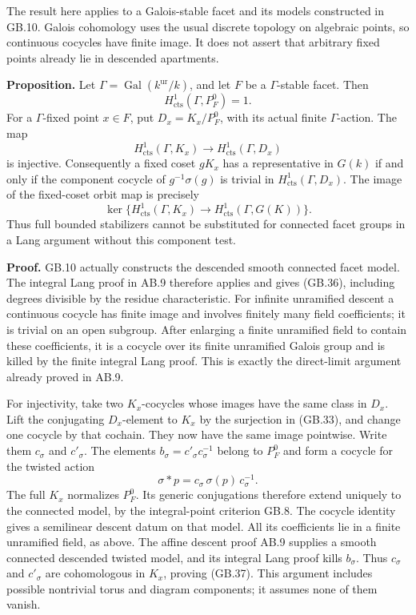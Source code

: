 \documentclass[
  11pt,
]{article}
\begin{document}
The result here applies to a Galois-stable facet and its models
constructed in GB.10. Galois cohomology uses the usual discrete topology
on algebraic points, so continuous cocycles have finite image. It does
not assert that arbitrary fixed points already lie in descended
apartments.

\textbf{Proposition.} Let
\(\Gamma=\operatorname {Gal}(k^{\mathrm{ur}}/k)\), and let \(F\) be a
\(\Gamma\)-stable facet. Then \[
 H^1_{\mathrm{cts}}(\Gamma,P_F^0)=1.
 \tag{GB.36}
\] For a \(\Gamma\)-fixed point \(x\in F\), put \(D_x=K_x/P_F^0\), with
its actual finite \(\Gamma\)-action. The map \[
 H^1_{\mathrm{cts}}(\Gamma,K_x)\longrightarrow
 H^1_{\mathrm{cts}}(\Gamma,D_x)
 \tag{GB.37}
\] is injective. Consequently a fixed coset \(gK_x\) has a
representative in \(G(k)\) if and only if the component cocycle of
\(g^{-1}\sigma(g)\) is trivial in \(H^1_{\mathrm{cts}}(\Gamma,D_x)\).
The image of the fixed-coset orbit map is precisely \[
 \ker\{H^1_{\mathrm{cts}}(\Gamma,K_x)
                 \longrightarrow H^1_{\mathrm{cts}}(\Gamma,G(K))\}.
 \tag{GB.38}
\] Thus full bounded stabilizers cannot be substituted for connected
facet groups in a Lang argument without this component test.

\textbf{Proof.} GB.10 actually constructs the descended smooth connected
facet model. The integral Lang proof in AB.9 therefore applies and gives
(GB.36), including degrees divisible by the residue characteristic. For
infinite unramified descent a continuous cocycle has finite image and
involves finitely many field coefficients; it is trivial on an open
subgroup. After enlarging a finite unramified field to contain these
coefficients, it is a cocycle over its finite unramified Galois group
and is killed by the finite integral Lang proof. This is exactly the
direct-limit argument already proved in AB.9.

For injectivity, take two \(K_x\)-cocycles whose images have the same
class in \(D_x\). Lift the conjugating \(D_x\)-element to \(K_x\) by the
surjection in (GB.33), and change one cocycle by that cochain. They now
have the same image pointwise. Write them \(c_\sigma\) and
\(c'_\sigma\). The elements \(b_\sigma=c'_\sigma c_\sigma^{-1}\) belong
to \(P_F^0\) and form a cocycle for the twisted action \[
 \sigma * p=c_\sigma\,\sigma(p)\,c_\sigma^{-1}.
 \tag{GB.39}
\] The full \(K_x\) normalizes \(P_F^0\). Its generic conjugations
therefore extend uniquely to the connected model, by the integral-point
criterion GB.8. The cocycle identity gives a semilinear descent datum on
that model. All its coefficients lie in a finite unramified field, as
above. The affine descent proof AB.9 supplies a smooth connected
descended twisted model, and its integral Lang proof kills \(b_\sigma\).
Thus \(c_\sigma\) and \(c'_\sigma\) are cohomologous in \(K_x\), proving
(GB.37). This argument includes possible nontrivial torus and diagram
components; it assumes none of them vanish.
\end{document}
